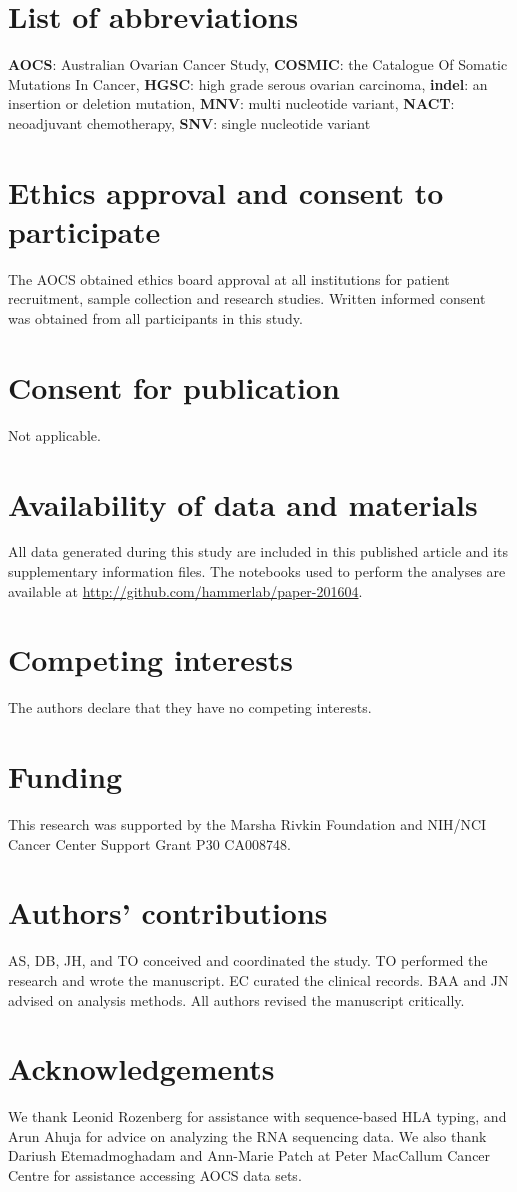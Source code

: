 \section{List of abbreviations}
\textbf{AOCS}: Australian Ovarian Cancer Study, \textbf{COSMIC}: the Catalogue Of Somatic Mutations In Cancer, \textbf{HGSC}: high grade serous ovarian carcinoma, \textbf{indel}: an insertion or deletion mutation, \textbf{MNV}: multi nucleotide variant, \textbf{NACT}: neoadjuvant chemotherapy, \textbf{SNV}: single nucleotide variant

\section{Ethics approval and consent to participate}
The AOCS obtained ethics board approval at all institutions for patient recruitment, sample collection and research studies. Written informed consent was obtained from all participants in this study.

\section{Consent for publication}
Not applicable.

\section{Availability of data and materials}
All data generated during this study are included in this published article and its supplementary information files. The notebooks used to perform the analyses are available at \url{http://github.com/hammerlab/paper-201604}.

\section{Competing interests}
The authors declare that they have no competing interests.

\section{Funding}
This research was supported by the Marsha Rivkin Foundation and NIH/NCI Cancer Center Support Grant P30 CA008748.

\section{Authors' contributions}
AS, DB, JH, and TO conceived and coordinated the study. TO performed the research and wrote the manuscript. EC curated the clinical records. BAA and JN advised on analysis methods.  All authors revised the manuscript critically.

\section{Acknowledgements}
We thank Leonid Rozenberg for assistance with sequence-based HLA typing, and Arun Ahuja for advice on analyzing the RNA sequencing data. We also thank Dariush Etemadmoghadam and Ann-Marie Patch at Peter MacCallum Cancer Centre for assistance accessing AOCS data sets.
